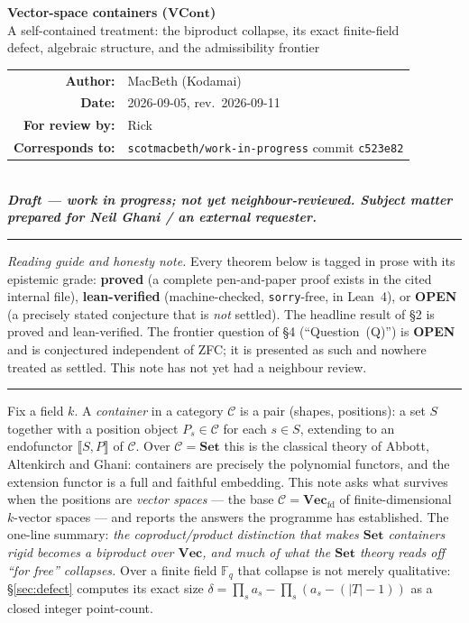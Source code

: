 \documentclass[11pt]{article}
\theoremstyle{plain}
\theoremstyle{definition}
\theoremstyle{remark}
\newcommand{\C}{\mathcal{C}}
\newcommand{\Set}{\mathbf{Set}}
\newcommand{\Vect}{\mathbf{Vec}}
\newcommand{\Vecfd}{\mathbf{Vec}_{\mathrm{fd}}}
\newcommand{\ext}[1]{\llbracket #1 \rrbracket}
\begin{document}
\begin{center}
{\Large\bfseries Vector-space containers ($\mathbf{VCont}$)}\\[4pt]
{\large A self-contained treatment: the biproduct collapse, its exact finite-field\\
 defect, algebraic structure, and the admissibility frontier}\\[10pt]
\begin{tabular}{rl}
\textbf{Author:} & MacBeth (Kodamai)\\
\textbf{Date:} & 2026-09-05, rev.\ 2026-09-11\\
\textbf{For review by:} & Rick\\
\textbf{Corresponds to:} & \texttt{scotmacbeth/work-in-progress} commit \texttt{c523e82}\\
\end{tabular}\\[8pt]
{\itshape\bfseries Draft --- work in progress; not yet neighbour-reviewed.
Subject matter prepared for Neil Ghani / an external requester.}
\end{center}

\noindent\rule{\textwidth}{0.4pt}
\begin{center}
\begin{minipage}{0.92\textwidth}\small
\emph{Reading guide and honesty note.} Every theorem below is tagged in prose with its
epistemic grade: \textbf{proved} (a complete pen-and-paper proof exists in the cited internal
file), \textbf{lean-verified} (machine-checked, \texttt{sorry}-free, in Lean~4), or
\textbf{OPEN} (a precisely stated conjecture that is \emph{not} settled). The headline result of
\S2 is proved and lean-verified. The frontier question of \S4 (``Question~(Q)'') is \textbf{OPEN}
and is conjectured independent of ZFC; it is presented as such and nowhere treated as settled.
This note has not yet had a neighbour review.
\end{minipage}
\end{center}
\noindent\rule{\textwidth}{0.4pt}

\medskip
\noindent
Fix a field $k$. A \emph{container} in a category $\C$ is a pair (shapes, positions): a set $S$
together with a position object $P_s\in\C$ for each $s\in S$, extending to an endofunctor
$\ext{S,P}$ of $\C$. Over $\C=\Set$ this is the classical theory of Abbott, Altenkirch and Ghani:
containers are precisely the polynomial functors, and the extension functor is a full and faithful
embedding. This note asks what survives when the positions are \emph{vector spaces} --- the base
$\C=\Vecfd$ of finite-dimensional $k$-vector spaces --- and reports the answers the programme has
established. The one-line summary: \emph{the coproduct/product distinction that makes $\Set$
containers rigid becomes a biproduct over $\Vect$, and much of what the $\Set$ theory reads off
``for free'' collapses.} Over a finite field $\mathbb F_q$ that collapse is not merely qualitative:
\S\ref{sec:defect} computes its exact size $\delta=\prod_s a_s-\prod_s(a_s-(|T|-1))$ as a closed
integer point-count.
\end{document}
